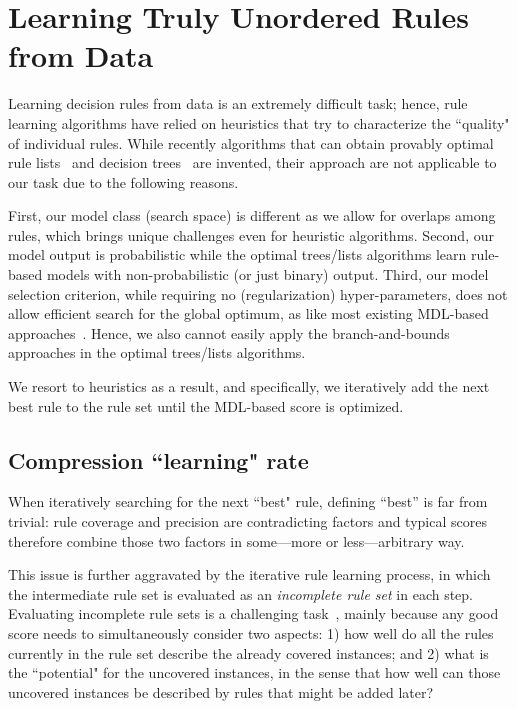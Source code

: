 \section{Learning Truly Unordered Rules from Data} \label{sec:alg}
Learning decision rules from data is an extremely difficult task; hence, rule learning algorithms have relied on heuristics that try to characterize the ``quality" of individual rules. While recently algorithms that can obtain provably optimal rule lists~\citep{angelino2017learning} and decision trees~\citep{hu2019optimal} are invented, their approach are not applicable to our task due to the following reasons. 

First, our model class (search space) is different as we allow for overlaps among rules, which brings unique challenges even for heuristic algorithms. Second, our model output is probabilistic while the optimal trees/lists algorithms learn rule-based models with non-probabilistic (or just binary) output. Third, our model selection criterion, while requiring no (regularization) hyper-parameters, does not allow efficient search for the global optimum, as like most existing MDL-based approaches~\citep{galbrun2022minimum}. Hence, we also cannot easily apply the branch-and-bounds approaches in the optimal trees/lists algorithms. 

We resort to heuristics as a result, and specifically, we iteratively add the next best rule to the rule set until the MDL-based score is optimized. 

\subsection{Compression ``learning" rate} \label{subsec:learning_rate}
When iteratively searching for the next ``best" rule, defining ``best'' is far from trivial: rule coverage and precision are contradicting factors and typical scores therefore combine those two factors in some---more or less---arbitrary way. 

This issue is further aggravated by the iterative rule learning process, in which the intermediate rule set is evaluated as an \emph{incomplete rule set} in each step. Evaluating incomplete rule sets is a challenging task~\citep{furnkranz2005roc}, mainly because any good score needs to simultaneously consider two aspects: 1) how well do all the rules currently in the rule set describe the already covered instances; and 2) what is the ``potential" for the uncovered instances, in the sense that how well can those uncovered instances be described by rules that might be added later?

